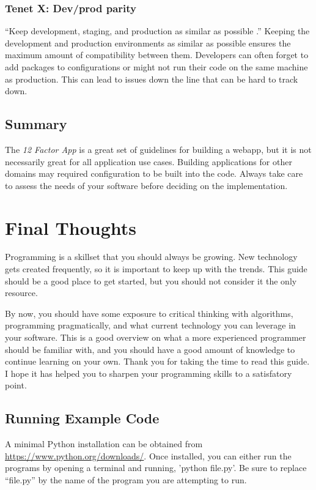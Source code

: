 \documentclass[12pt, oneside, a4paper]{book}
\begin{document}
      \subsection{Tenet X: Dev/prod parity}
      ``Keep development, staging, and production as similar as possible \autocite{wigginsTwelveFactorApp2017}.''
      Keeping the development and production environments as similar as possible ensures the maximum amount of compatibility between them.
      Developers can often forget to add packages to configurations or might not run their code on the same machine as production.
      This can lead to issues down the line that can be hard to track down.

      \section{Summary}
      The \textit{12 Factor App} is a great set of guidelines for building a webapp, but it is not necessarily great for all application use cases.
      Building applications for other domains may required configuration to be built into the code.
      Always take care to assess the needs of your software before deciding on the implementation.

      \chapter{Final Thoughts}
      Programming is a skillset that you should always be growing.
      New technology gets created frequently, so it is important to keep up with the trends.
      This guide should be a good place to get started, but you should not consider it the only resource.

      By now, you should have some exposure to critical thinking with algorithms, programming pragmatically, and what current technology you can leverage in your software.
      This is a good overview on what a more experienced programmer should be familiar with, and you should have a good amount of knowledge to continue learning on your own.
      Thank you for taking the time to read this guide.
      I hope it has helped you to sharpen your programming skills to a satisfatory point.

   \appendix
   \begin{appendices}
   \chapter{Running Example Code}
   A minimal Python installation can be obtained from \url{https://www.python.org/downloads/}.
   Once installed, you can either run the programs by opening a terminal and running, 'python file.py'.
   Be sure to replace ``file.py'' by the name of the program you are attempting to run.
\newpage
{}
\printbibliography[title={Works Cited},heading=bibintoc]
   \end{appendices}
\end{document}
